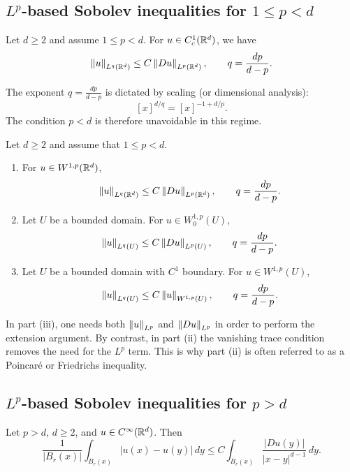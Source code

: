 \subsection{$L^p$-based Sobolev inequalities for $1 \le p < d$}

\begin{theorem}
Let $d \ge 2$ and assume $1\le p<d$. For $u\in C_c^1(\mathbb{R}^d)$, we have
\[
\left\lVert u \right\rVert_{L^q(\mathbb{R}^d)} \le C\left\lVert Du \right\rVert_{L^p(\mathbb{R}^d)},
\qquad q=\frac{dp}{d-p}.
\]
\end{theorem}

\begin{remark}
The exponent $q=\frac{dp}{d-p}$ is dictated by scaling (or dimensional analysis):
\[
[x]^{d/q}=[x]^{-1+d/p}.
\]
The condition $p<d$ is therefore unavoidable in this regime.
\end{remark}

\begin{theorem}
Let $d\ge 2$ and assume that $1\le p<d$.
\begin{enumerate}
    \item For $u\in W^{1,p}(\mathbb{R}^d)$,
    \[
    \left\lVert u \right\rVert_{L^q(\mathbb{R}^d)} \le C\left\lVert Du \right\rVert_{L^p(\mathbb{R}^d)},
    \qquad q=\frac{dp}{d-p}.
    \]
    \item Let $U$ be a bounded domain. For $u\in W_0^{1,p}(U)$,
    \[
    \left\lVert u \right\rVert_{L^q(U)} \le C\left\lVert Du \right\rVert_{L^p(U)},
    \qquad q=\frac{dp}{d-p}.
    \]
    \item Let $U$ be a bounded domain with $C^1$ boundary. For $u\in W^{1,p}(U)$,
    \[
    \left\lVert u \right\rVert_{L^q(U)} \le C\left\lVert u \right\rVert_{W^{1,p}(U)},
    \qquad q=\frac{dp}{d-p}.
    \]
\end{enumerate}
\end{theorem}

\begin{remark}
In part \textup{(iii)}, one needs both $\left\lVert u \right\rVert_{L^p}$ and $\left\lVert Du \right\rVert_{L^p}$ in order to perform the extension argument. By contrast, in part \textup{(ii)} the vanishing trace condition removes the need for the $L^p$ term. This is why part \textup{(ii)} is often referred to as a Poincar\'{e} or Friedrichs inequality.
\end{remark}

\subsection{$L^p$-based Sobolev inequalities for $p>d$}

\begin{lemma}
Let $p>d$, $d\ge 2$, and $u\in C^\infty(\mathbb{R}^d)$. Then
\[
\frac{1}{|B_r(x)|}\int_{B_r(x)} |u(x)-u(y)|\,dy
\le
C\int_{B_r(x)} \frac{|Du(y)|}{|x-y|^{d-1}}\,dy.
\]
\end{lemma}

